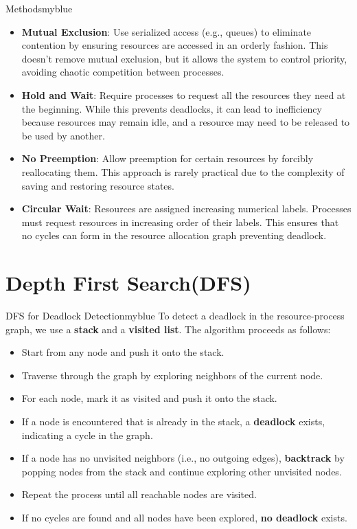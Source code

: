 \begin{prettyBox}{Methods}{myblue}
\begin{itemize}
\begin{itemize}
\item \textbf{Mutual Exclusion}: Use serialized access (e.g., queues) to eliminate contention by ensuring resources are accessed in an orderly fashion. This doesn't remove mutual exclusion, but it allows the system to control priority, avoiding chaotic competition between processes.
        \item \textbf{Hold and Wait}: Require processes to request all the resources they need at the beginning. 
        While this prevents deadlocks, it can lead to inefficiency because resources may remain idle, and a resource may need to be released to be used by another.
        \item \textbf{No Preemption}: Allow preemption for certain resources by forcibly reallocating them. This
            approach is rarely practical due to the complexity of saving and restoring resource states.
        \item \textbf{Circular Wait}: Resources are assigned increasing numerical labels. Processes must request 
    resources in increasing order of their labels. This ensures that no cycles can form in the resource allocation graph preventing deadlock.
    \end{itemize}
\end{itemize}
\end{prettyBox}

\vspace{0.5cm}
\section{Depth First Search(DFS)}


\begin{prettyBox}{DFS for Deadlock Detection}{myblue}
    To detect a deadlock in the resource-process graph, we use a \textbf{stack} and a \textbf{visited list}. The algorithm proceeds as follows:

\begin{itemize}
    \item Start from any node and push it onto the stack.
    \item Traverse through the graph by exploring neighbors of the current node.
    \item For each node, mark it as visited and push it onto the stack.
\item If a node is encountered that is already in the stack, a \textbf{deadlock} exists, indicating a cycle in the graph.
\item If a node has no unvisited neighbors (i.e., no outgoing edges), \textbf{backtrack} by popping nodes from the stack and continue exploring other unvisited nodes.
    \item Repeat the process until all reachable nodes are visited.
    \item If no cycles are found and all nodes have been explored, \textbf{no deadlock} exists.
\end{itemize}
\end{prettyBox}

